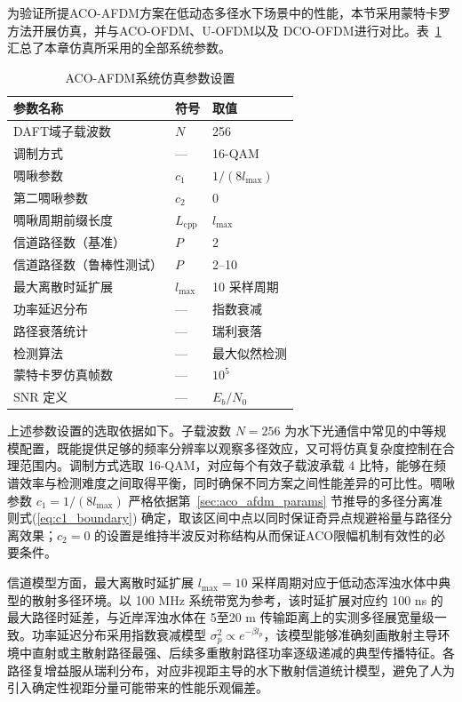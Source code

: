 为验证所提ACO-AFDM方案在低动态多径水下场景中的性能，本节采用蒙特卡罗方法开展仿真，并与ACO-OFDM、U-OFDM以及 DCO-OFDM进行对比\cite{dissanayakeComparisonACOOFDMDCOOFDM2013, fernandoFlipOFDMUnipolarCommunication2011}。表~\ref{tab:ch3_sim_params} 汇总了本章仿真所采用的全部系统参数。
\begin{table}[H]
\centering
\caption{ACO-AFDM系统仿真参数设置}
\label{tab:ch3_sim_params}
\begin{tabular}{lll}
\toprule
参数名称 & 符号 & 取值 \\
\midrule
DAFT域子载波数 & $N$ & 256 \\
调制方式 & — & 16-QAM \\
啁啾参数 & $c_1$ & $1/(8l_{\max})$ \\
第二啁啾参数 & $c_2$ & 0 \\
啁啾周期前缀长度 & $L_{\mathrm{cpp}}$ & $l_{\max}$ \\
信道路径数（基准） & $P$ & 2 \\
信道路径数（鲁棒性测试） & $P$ & 2--10 \\
最大离散时延扩展 & $l_{\max}$ & 10 采样周期 \\
功率延迟分布 & — & 指数衰减 \\
路径衰落统计 & — & 瑞利衰落 \\
检测算法 & — & 最大似然检测 \\
蒙特卡罗仿真帧数 & — & $10^5$ \\
SNR 定义 & — & $E_b/N_0$ \\
\bottomrule
\end{tabular}
\end{table}

上述参数设置的选取依据如下。子载波数 $N=256$ 为水下光通信中常见的中等规模配置，既能提供足够的频率分辨率以观察多径效应，又可将仿真复杂度控制在合理范围内。调制方式选取 16-QAM，对应每个有效子载波承载 4 比特，能够在频谱效率与检测难度之间取得平衡，同时确保不同方案之间性能差异的可比性。啁啾参数 $c_1 = 1/(8l_{\max})$ 严格依据第~\ref{sec:aco_afdm_params} 节推导的多径分离准则式(\ref{eq:c1_boundary}) 确定，取该区间中点以同时保证奇异点规避裕量与路径分离效果；$c_2=0$ 的设置是维持半波反对称结构从而保证ACO限幅机制有效性的必要条件。

信道模型方面，最大离散时延扩展 $l_{\max}=10$ 采样周期对应于低动态浑浊水体中典型的散射多径环境。以 100 MHz 系统带宽为参考，该时延扩展对应约 100 ns 的最大路径时延差，与近岸浑浊水体在 5至20 m 传输距离上的实测多径展宽量级一致\cite{jaruwatanadilokUnderwaterWirelessOptical2008}。功率延迟分布采用指数衰减模型 $\sigma_p^2 \propto e^{-\beta l_p}$，该模型能够准确刻画散射主导环境中直射或主散射路径最强、后续多重散射路径功率逐级递减的典型传播特征。各路径复增益服从瑞利分布，对应非视距主导的水下散射信道统计模型，避免了人为引入确定性视距分量可能带来的性能乐观偏差。

